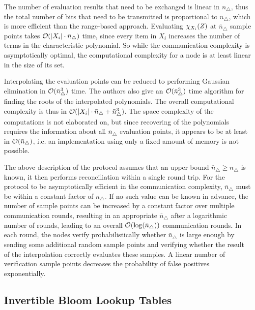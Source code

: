 The number of evaluation results that need to be exchanged is linear in $n_{\triangle}$, thus the total number of bits that need to be transmitted is proportional to $n_{\triangle}$, which is more efficient than the range-based approach. Evaluating $\chi_{X_i}(Z)$ at $\bar{n}_{\triangle}$ sample points takes $\mathcal{O}(|{X_i}| \cdot \bar{n}_{\triangle})$ time, since every item in $X_i$ increases the number of terms in the characteristic polynomial. So while the communication complexity is asymptotically optimal, the computational complexity for a node is at least linear in the size of its set.

Interpolating the evaluation points can be reduced to performing Gaussian elimination in $\mathcal{O}(\bar{n}_{\triangle}^3)$ time. The authors also give an $\mathcal{O}(\bar{n}_{\triangle}^3)$ time algorithm for finding the roots of the interpolated polynomials. The overall computational complexity is thus in $\mathcal{O}(|{X_i}| \cdot \bar{n}_{\triangle} + \bar{n}_{\triangle}^3)$. The space complexity of the computations is not elaborated on, but since recovering of the polynomials requires the information about all $\bar{n}_{\triangle}$ evaluation points, it appears to be at least in $\mathcal{O}(\bar{n}_{\triangle})$, i.e. an implementation using only a fixed amount of memory is not possible.

The above description of the protocol assumes that an upper bound $\bar{n}_{\triangle} \geq n_{\triangle}$ is known, it then performs reconciliation within a single round trip. For the protocol to be asymptotically efficient in the communication complexity, $\bar{n}_{\triangle}$ must be within a constant factor of $n_{\triangle}$. If no such value can be known in advance, the number of sample points can be increased by a constant factor over multiple communication rounds, resulting in an appropriate $\bar{n}_{\triangle}$ after a logarithmic number of rounds, leading to an overall $\mathcal{O}(\log(\bar{n}_{\triangle}))$ communication rounds. In each round, the nodes verify probabilistically whether $\bar{n}_{\triangle}$ is large enough by sending some additional random sample points and verifying whether the result of the interpolation correctly evaluates these samples. A linear number of verification sample points decreases the probability of false positives exponentially.

\subsection{Invertible Bloom Lookup Tables}

